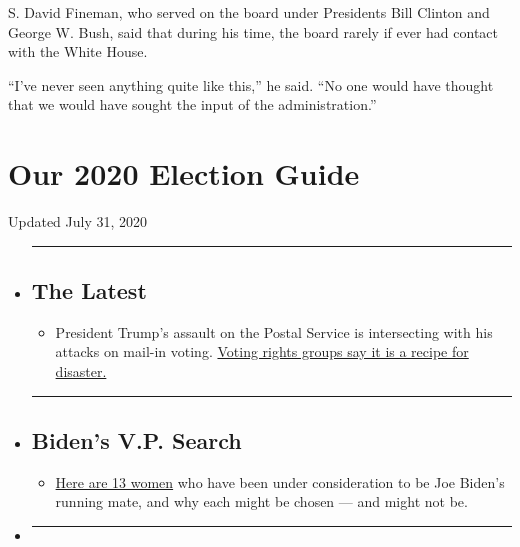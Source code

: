S. David Fineman, who served on the board under Presidents Bill Clinton
and George W. Bush, said that during his time, the board rarely if ever
had contact with the White House.

``I've never seen anything quite like this,'' he said. ``No one would
have thought that we would have sought the input of the
administration.''

\hypertarget{our-2020-election-guide}{%
\section{Our 2020 Election Guide}\label{our-2020-election-guide}}

Updated July 31, 2020

\begin{itemize}
\item
  \begin{center}\rule{0.5\linewidth}{\linethickness}\end{center}

  \hypertarget{the-latest}{%
  \subsection{The Latest}\label{the-latest}}

  \begin{itemize}
  \tightlist
  \item
    President Trump's assault on the Postal Service is intersecting with
    his attacks on mail-in voting.
    \href{https://www.nytimes3xbfgragh.onion/2020/07/31/us/politics/trump-usps-mail-delays.html?action=click\&pgtype=Article\&state=default\&region=BELOW_MAIN_CONTENT\&context=storylines_guide}{Voting
    rights groups say it is a recipe for disaster.}
  \end{itemize}
\item
  \begin{center}\rule{0.5\linewidth}{\linethickness}\end{center}

  \hypertarget{bidens-vp-search}{%
  \subsection{Biden's V.P. Search}\label{bidens-vp-search}}

  \begin{itemize}
  \tightlist
  \item
    \href{https://www.nytimes3xbfgragh.onion/article/biden-vice-president-2020.html?action=click\&pgtype=Article\&state=default\&region=BELOW_MAIN_CONTENT\&context=storylines_guide}{Here
    are 13 women} who have been under consideration to be Joe Biden's
    running mate, and why each might be chosen --- and might not be.
  \end{itemize}
\item
  \begin{center}\rule{0.5\linewidth}{\linethickness}\end{center}


\end{itemize}
